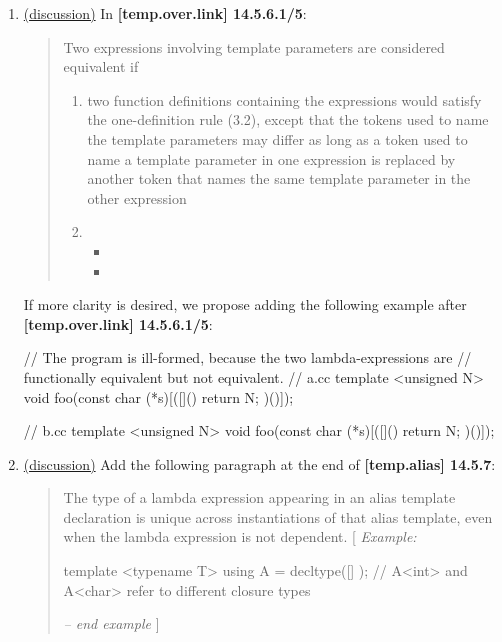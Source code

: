 \documentclass{wg21}
\begin{document}
\begin{enumerate}
  \item \label{wording.template} \hyperref[discussion.template]{(discussion)}
    In \textbf{[temp.over.link] 14.5.6.1/5}:
    \begin{quote}
      Two expressions involving template parameters are considered equivalent if\added{:}
      \begin{enumerate}[label=\arabic*.]
        \item two function definitions containing the expressions would satisfy the
              one-definition rule (3.2), except that the tokens used to name the template
              parameters may differ as long as a token used to name a template parameter
              in one expression is replaced by another token that names the same template
              parameter in the other expression

        \item {}
          \begin{itemize}
            \item {}
            \item {}
          \end{itemize}
      \end{enumerate}
    \end{quote}

    If more clarity is desired, we propose adding the following example after
    \textbf{[temp.over.link] 14.5.6.1/5}:
\begin{cpp}
// The program is ill-formed, because the two lambda-expressions are
// functionally equivalent but not equivalent.
// a.cc
template <unsigned N>
void foo(const char (*s)[([]() { return N; })()]);

// b.cc
template <unsigned N>
void foo(const char (*s)[([]() { return N; })()]);
\end{cpp}

  \item \label{wording.redeclarations} \hyperref[discussion.redeclarations]{(discussion)}
    Add the following paragraph at the end of \textbf{[temp.alias] 14.5.7}:
    \begin{quote}
      The type of a lambda expression appearing in an alias template declaration
      is unique across instantiations of that alias template, even when the
      lambda expression is not dependent.
      [ \textit{Example:}
\begin{cpp}
template <typename T>
using A = decltype([] {});
// A<int> and A<char> refer to different closure types
\end{cpp}
      \textit{-- end example} ]
    \end{quote}


\end{enumerate}
\end{document}
